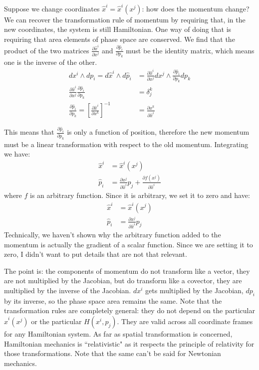 \documentclass[aps,pra,10pt,floatfix,nofootinbib]{revtex4-1}
\theoremstyle{definition}
\begin{document}
Suppose we change coordinates $\hat{x}^i = \hat{x}^i(x^j)$: how does the momentum change? We can recover the transformation rule of momentum by requiring that, in the new coordinates, the system is still Hamiltonian. One way of doing that is requiring that area elements of phase space are conserved. We find that the product of the two matrices $\frac{\partial \hat{x}^i}{\partial x^j}$ and $\frac{\partial \hat{p}_i}{\partial p_k}$ must be the identity matrix, which means one is the inverse of the other.
\begin{equation*}
\begin{aligned}
dx^i \wedge dp_i = d\hat{x}^i\wedge d\hat{p}_i &=  \frac{\partial \hat{x}^i}{\partial x^j} dx^j \wedge \frac{\partial \hat{p}_i}{\partial p_k} dp_k \\
\frac{\partial \hat{x}^i}{\partial x^j} \frac{\partial \hat{p}_i}{\partial p_k} &= \delta^k_j \\
\frac{\partial \hat{p}_i}{\partial p_k} = \left[\frac{\partial \hat{x}^i}{\partial x^k}\right]^{-1} &=  \frac{\partial x^k}{\partial \hat{x}^i}
\end{aligned}
\end{equation*}

This means that $\frac{\partial \hat{p}_i}{\partial p_k}$ is only a function of position, therefore the new momentum must be a linear transformation with respect to the old momentum. Integrating we have:
\begin{equation*}
\begin{aligned}
\hat{x}^i &= \hat{x}^i(x^j) \\
\hat{p}_i &= \frac{\partial x^j}{\partial \hat{x}^i} p_j + \frac{\partial f(x^j)}{\partial \hat{x}^i}
\end{aligned}
\end{equation*}
where $f$ is an arbitrary function. Since it is arbitrary, we set it to zero and have:
\begin{equation}
\begin{aligned}
\hat{x}^i &= \hat{x}^i(x^j) \\
\hat{p}_i &= \frac{\partial x^j}{\partial \hat{x}^i} p_j
\end{aligned}
\label{spaceTransf}
\end{equation}
Technically, we haven't shown why the arbitrary function added to the momentum is actually the gradient of a scalar function. Since we are setting it to zero, I didn't want to put details that are not that relevant.

The point is: the components of momentum do not transform like a vector, they are not multiplied by the Jacobian, but do transform like a covector, they are multiplied by the inverse of the Jacobian. $dx^i$ gets multiplied by the Jacobian, $dp_i$ by its inverse, so the phase space area remains the same. Note that the transformation rules are completely general: they do not depend on the particular $\hat{x}^i(x^j)$ or the particular $H(x^i,p_j)$. They are valid across all coordinate frames for any Hamiltonian system. As far as spatial transformation is concerned, Hamiltonian mechanics is ``relativistic" as it respects the principle of relativity for those transformations. Note that the same can't be said for Newtonian mechanics.
\end{document}
